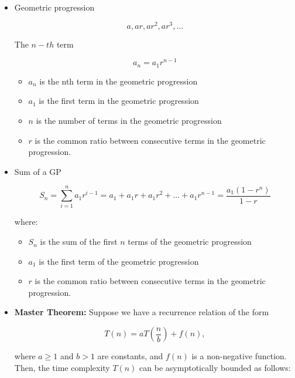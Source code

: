 \documentclass{article}
\begin{document}
\begin{enumerate}
\begin{itemize}
    \item Geometric progression
    
    \begin{equation*}
        a, ar, ar^2, ar^3,...
    \end{equation*}

    The $n-th$ term

    \begin{equation*}
        a_n = a_1 r^{n-1}
    \end{equation*}

    \begin{itemize}
        \item $a_n$ is the nth term in the geometric progression
        \item $a_1$ is the first term in the geometric progression
        \item $n$ is the number of terms in the geometric progression
        \item $r$ is the common ratio between consecutive terms in the geometric progression.    
    \end{itemize}
    
    \item Sum of a GP
    
    \begin{equation*}
        S_n = \sum^{n}_{i=1} a_1r^{i-1} = a_1 + a_1r + a_1r^2 + ... + a_1r^{n-1} =  \frac{a_1(1-r^n)}{1-r}    
    \end{equation*}
        
        where:
        
    \begin{itemize}
        \item $S_n$ is the sum of the first $n$ terms of the geometric progression
        \item $a_1$ is the first term of the geometric progression
        \item $r$ is the common ratio between consecutive terms in the geometric progression.
    \end{itemize}

    \item \textbf{Master Theorem:} Suppose we have a recurrence relation of the form

    \begin{equation*}
    T(n) = a T(\frac{n}{b}) + f(n),
    \end{equation*}
    
    where $a \geq 1$ and $b > 1$ are constants, and $f(n)$ is a non-negative function. Then, the time complexity $T(n)$ can be asymptotically bounded as follows:
    

\end{itemize}
\end{enumerate}
\end{document}
